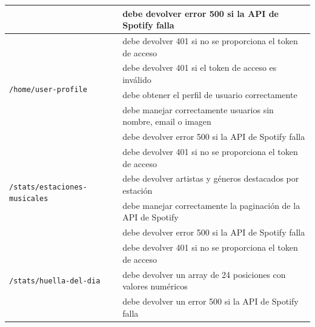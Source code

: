 \begin{longtable}{|p{5cm}|p{9cm}|}
                                                          & debe devolver error 500 si la API de Spotify falla                                       \\ \hline
    \multirow{5}{*}{\texttt{/home/user-profile}}          & debe devolver 401 si no se proporciona el token de acceso                                \\ \cline{2-2}
                                                          & debe devolver 401 si el token de acceso es inválido                                      \\ \cline{2-2}
                                                          & debe obtener el perfil de usuario correctamente                                          \\ \cline{2-2}
                                                          & debe manejar correctamente usuarios sin nombre, email o imagen                           \\ \cline{2-2}
                                                          & debe devolver error 500 si la API de Spotify falla                                       \\ \hline
    \multirow{4}{*}{\texttt{/stats/estaciones-musicales}} & debe devolver 401 si no se proporciona el token de acceso                                \\ \cline{2-2}
                                                          & debe devolver artistas y géneros destacados por estación                                 \\ \cline{2-2}
                                                          & debe manejar correctamente la paginación de la API de Spotify                            \\ \cline{2-2}
                                                          & debe devolver error 500 si la API de Spotify falla                                       \\ \hline
    \multirow{3}{*}{\texttt{/stats/huella-del-dia}}       & debe devolver 401 si no se proporciona el token de acceso                                \\ \cline{2-2}
                                                          & debe devolver un array de 24 posiciones con valores numéricos                            \\ \cline{2-2}
                                                          & debe devolver un error 500 si la API de Spotify falla                                    \\ \hline

\end{longtable}
